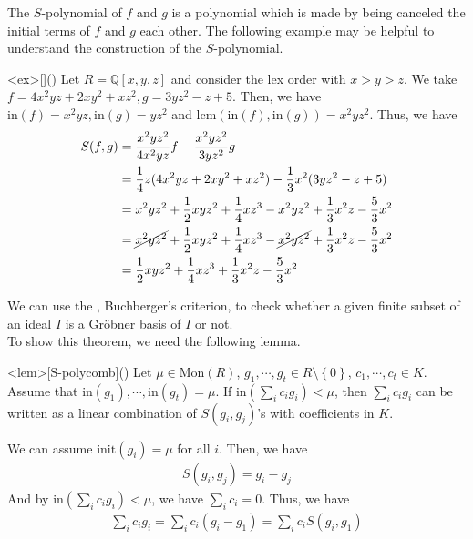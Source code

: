 \documentclass{article}
\begin{document}
The $S$-polynomial of $f$ and $g$ is a polynomial which is made by being canceled the initial terms of $f$ and $g$ each other. The following example may be helpful to understand the construction of the $S$-polynomial.

\begin{statementsp}<ex>[]()
    Let $R = \mathbb{Q}[x,y,z]$ and consider the lex order with $x > y > z$. We take $f = 4x^2yz + 2xy^2 + xz^2, g = 3yz^2 - z + 5$. Then, we have $\mathrm{in}(f) = x^2yz, \mathrm{in}(g) = yz^2$ and $\mathrm{lcm}(\mathrm{in}(f), \mathrm{in}(g)) = x^2yz^2$. Thus, we have
    \begin{align}
        S(f,g) &= \frac{x^2yz^2}{4x^2yz} f - \frac{x^2yz^2}{3yz^2} g \\
        &= \frac{1}{4} z (4x^2yz + 2xy^2 + xz^2) - \frac{1}{3} x^2 (3yz^2 - z + 5) \\
        &= x^2yz^2 + \frac{1}{2} xyz^2 + \frac{1}{4} xz^3 - x^2yz^2 + \frac{1}{3} x^2 z - \frac{5}{3} x^2 \\
        &= \cancel{x^2yz^2} + \frac{1}{2} xyz^2 + \frac{1}{4} xz^3 - \cancel{x^2yz^2} + \frac{1}{3} x^2 z - \frac{5}{3} x^2 \\
        &= \frac{1}{2} xyz^2 + \frac{1}{4} xz^3 + \frac{1}{3} x^2 z - \frac{5}{3} x^2
    \end{align}
\end{statementsp}

We can use the , Buchberger's criterion, to check whether a given finite subset of an ideal $I$ is a Gr\"{o}bner basis of $I$ or not.\\ 
To show this theorem, we need the following lemma.

\begin{statementsp}<lem>[S-polycomb]()
    Let $\mu \in \mathrm{Mon}(R)$, $g_1, \cdots, g_t \in R \setminus \left\{ 0 \right\}$, $c_1, \cdots, c_t \in K$. Assume that $\mathrm{in}(g_1), \cdots, \mathrm{in}(g_t) = \mu$. If $\displaystyle{\mathrm{in}\left( \sum_i c_i g_i \right) < \mu}$, then $\displaystyle{\sum_i c_i g_i}$ can be written as a linear combination of $S(g_i, g_j)$'s with coefficients in $K$.
\end{statementsp}
\begin{pfsp}
    We can assume $\mathrm{init}(g_i) = \mu$ for all $i$. Then, we have
    \begin{align}
        S(g_i, g_j) = g_i - g_j
    \end{align}
    And by $\displaystyle{\mathrm{in}\left( \sum_i c_i g_i \right) < \mu}$, we have $\sum_i c_i = 0$. Thus, we have
    \begin{align}
        \sum_i c_i g_i = \sum_i c_i (g_i - g_1) = \sum_i c_i S(g_i, g_1)
    \end{align}
\end{pfsp} 
\end{document}
